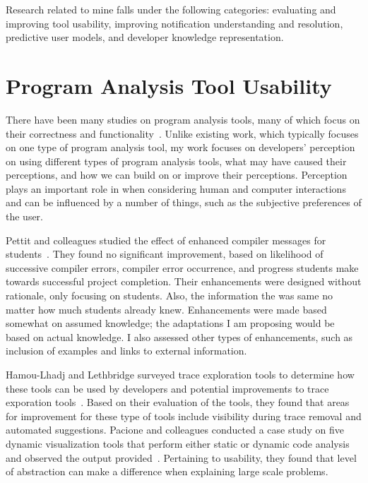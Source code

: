 


Research related to mine falls under the following categories: evaluating and improving tool usability, improving notification understanding and resolution, predictive user models, and developer knowledge representation.

\section{Program Analysis Tool Usability}

There have been many studies on program analysis tools, many of which focus on
their correctness and functionality~\cite{Ayewah:2008:FindBugs,Bessey:2010:Coverity,dugan2000developing,luk2005pin}.
Unlike existing work, which typically focuses on one type of program analysis tool, my work focuses on developers' perception on 
using different types of program analysis tools, what may have caused their perceptions, and how we can build on or improve their perceptions. 
Perception plays an important role in when considering human and computer interactions~\cite{Dastani:2002:Perception} and
can be influenced by a number of things, such as the subjective preferences of
the user.

Pettit and colleagues studied the effect of enhanced compiler messages for students~\cite{pettit2017enhanced}.
They found no significant improvement, based on likelihood of successive compiler errors, compiler error occurrence, and progress students make towards successful project completion.
Their enhancements were designed without rationale, only focusing on students. Also, the information the was same no matter how much students already knew. Enhancements were made based somewhat on assumed knowledge; the adaptations I am proposing would be based on actual knowledge.
I also assessed other types of enhancements, such as inclusion of examples and links to external information.

Hamou-Lhadj and Lethbridge surveyed trace exploration tools to determine how these tools 
can be used by developers and potential improvements to trace exporation tools~\cite{hamou2004survey}. 
Based on their evaluation of the tools, they found that areas 
for improvement for these type of tools include visibility during trace removal and automated suggestions.
Pacione and colleagues conducted a case study on five dynamic visualization tools that perform either static or dynamic code analysis and observed the output provided~\cite{pacione2003comparative}. Pertaining to usability, they found that level of abstraction can make a difference when explaining large scale problems.

